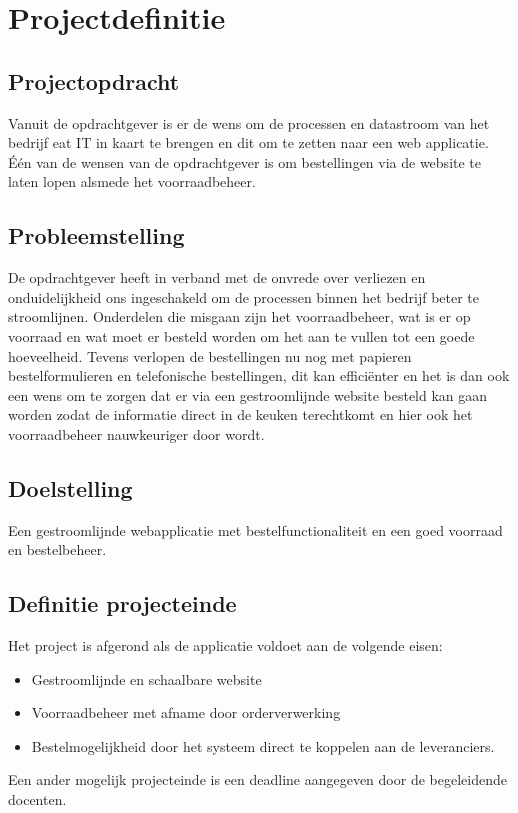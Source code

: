 \documentclass{verslag}
\begin{document}
\section{Projectdefinitie} %
\label{sec:projectdefinitie}
    
    \subsection{Projectopdracht} %
    \label{sub:projectopdracht}
    Vanuit de opdrachtgever is er de wens om de processen en datastroom van het bedrijf eat IT in kaart te brengen en dit om te zetten naar een web applicatie. Één van de wensen van de opdrachtgever is om bestellingen via de website te laten lopen alsmede het voorraadbeheer. 

    \subsection{Probleemstelling} %
    \label{sub:probleemstelling}
    De opdrachtgever heeft in verband met de onvrede over verliezen en onduidelijkheid ons ingeschakeld om de processen binnen het bedrijf beter te stroomlijnen. Onderdelen die misgaan zijn het voorraadbeheer, wat is er op voorraad en wat moet er besteld worden om het aan te vullen tot een goede hoeveelheid. Tevens verlopen de bestellingen nu nog met papieren bestelformulieren en telefonische bestellingen, dit kan efficiënter en het is dan ook een wens om te zorgen dat er via een gestroomlijnde website besteld kan gaan worden zodat de informatie direct in de keuken terechtkomt en hier ook het voorraadbeheer nauwkeuriger door wordt.

    \subsection{Doelstelling} %
    \label{sub:doelstelling}
    Een gestroomlijnde webapplicatie met bestelfunctionaliteit en een goed voorraad en bestelbeheer.

    \subsection{Definitie projecteinde} %
    \label{sub:definitie_projecteinde}
    Het project is afgerond als de applicatie voldoet aan de volgende eisen:
    \begin{itemize}
        \item Gestroomlijnde en schaalbare website
        \item Voorraadbeheer met afname door orderverwerking
        \item Bestelmogelijkheid door het systeem direct te koppelen aan de leveranciers.
    \end{itemize}
    Een ander mogelijk projecteinde is een deadline aangegeven door de begeleidende docenten.
\end{document}
